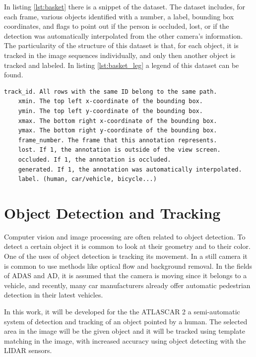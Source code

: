 In listing \ref{lst:basket} there is a snippet of the dataset. The dataset includes, for each frame, various objects identified with a number, a label, bounding box coordinates, and flags to point out if the person is occluded, lost, or if the detection was automatically interpolated from the other camera's information. \cite{EPFLEcolepolytechniquefederaledeLausanne} The particularity of the structure of this dataset is that, for each object, it is tracked in the image sequences individually, and only then another object is tracked and labeled. In listing \ref{lst:basket_leg} a legend of this dataset can be found.

\begin{center}
	\begin{lstlisting}[label={lst:basket_leg}, caption={EPFL dataset legend.}]
	track_id. All rows with the same ID belong to the same path.
	xmin. The top left x-coordinate of the bounding box.
	ymin. The top left y-coordinate of the bounding box.
	xmax. The bottom right x-coordinate of the bounding box.
	ymax. The bottom right y-coordinate of the bounding box.
	frame_number. The frame that this annotation represents.
	lost. If 1, the annotation is outside of the view screen.
	occluded. If 1, the annotation is occluded.
	generated. If 1, the annotation was automatically interpolated.
	label. (human, car/vehicle, bicycle...)	\end{lstlisting}
\end{center}



\section{Object Detection and Tracking}
Computer vision and image processing are often related to object detection. To detect a certain object it is common to look at their geometry and to their color. One of the uses of object detection is tracking its movement. In a still camera it is common to use methods like optical flow and background removal. In the fields of ADAS and AD, it is assumed that the camera is moving since it belongs to a vehicle, and recently, many car manufacturers already offer automatic pedestrian detection in their latest vehicles. 

In this work, it will be developed for the the ATLASCAR 2 a semi-automatic system of detection and tracking of an object pointed by a human. The selected area in the image  will be the given object and it will be tracked using template matching in the image, with increased accuracy using object detecting with the LIDAR sensors.

